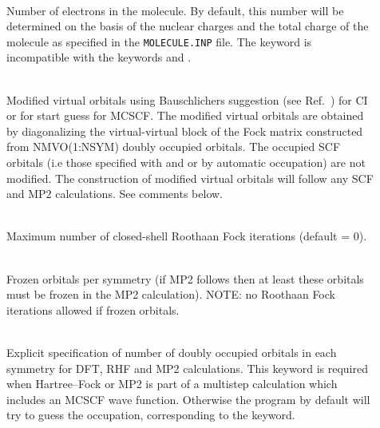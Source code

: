 \begin{description}

\item[]
   \\
  Number of electrons in the molecule. By
  default, this number will be
  determined on the basis of the nuclear charges and the total charge
  of the molecule as specified in the
  \verb|MOLECULE.INP| file. The
  keyword is incompatible with the keywords 
  and .

\item[]
   \\
  Modified virtual orbitals using Bauschlichers suggestion
  (see Ref.~\cite{cwbjcp72})
  for CI or for start guess for MCSCF. The modified virtual orbitals
  are obtained by  diagonalizing the virtual-virtual
  block of the Fock matrix constructed from NMVO(1:NSYM) doubly
  occupied orbitals.
  The occupied SCF orbitals (i.e those specified with
   and 
  or by automatic occupation) are not modified.
  The construction of modified virtual orbitals
  will follow any SCF and MP2 calculations.
  See comments below.

\item[]
   \\
  Maximum number of closed-shell Roothaan
  Fock iterations (default = 0).

\item[]
   \\
  Frozen orbitals per symmetry (if MP2 follows then at least these orbitals
  must be frozen in the MP2 calculation).
  NOTE: no Roothaan Fock iterations allowed if frozen orbitals.

\item[]
     \\
  Explicit specification of number of doubly occupied orbitals in each symmetry
  for DFT, RHF and MP2 calculations. This keyword
  is required when Hartree--Fock or MP2 is part of a multistep
  calculation which includes an MCSCF wave function. 
  Otherwise the program by default will try to guess the occupation,
  corresponding to the   keyword.


\end{description}
